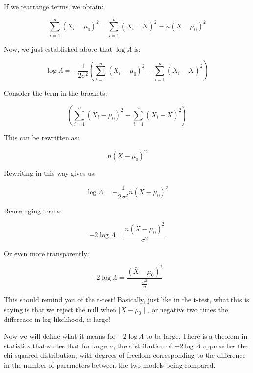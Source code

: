 \documentclass[12pt,]{krantz}
\begin{document}
If we rearrange terms, we obtain:

\begin{equation}
\sum_{i=1}^n (X_i -\mu_0)^2 - \sum_{i=1}^n (X_i - \bar{X})^2 = n(\bar{X} - \mu_0)^2 
\end{equation}

Now, we just established above that \(\log \Lambda\) is:

\begin{equation}
\log \Lambda= -\frac{1}{2\sigma^2} \left( \sum_{i=1}^n (X_i - \mu_0)^2  -  \sum_{i=1}^n (X_i - \bar{X})^2 \right)
\end{equation}

Consider the term in the brackets:

\begin{equation}
(\sum_{i=1}^n (X_i - \mu_0)^2  -  \sum_{i=1}^n (X_i - \bar{X})^2)
\end{equation}

This can be rewritten as:

\begin{equation}
n(\bar{X} - \mu_0)^2
\end{equation}

Rewriting in this way gives us:

\begin{equation}
\log \Lambda = -\frac{1}{2\sigma^2}   n(\bar{X} - \mu_0)^2 
\end{equation}

Rearranging terms:

\begin{equation}
-2 \log \Lambda =    \frac{n(\bar{X} - \mu_0)^2 }{\sigma^2}
\end{equation}

Or even more transparently:

\begin{equation}
-2 \log \Lambda =    \frac{(\bar{X} - \mu_0)^2 }{\frac{\sigma^2}{n}}
\end{equation}

This should remind you of the t-test! Basically, just like in the t-test, what this is saying is that we reject the null when \(\mid \bar{X} - \mu_0\mid\), or negative two times the difference in log likelihood, is large!

Now we will define what it means for \(-2\log \Lambda\) to be large. There is a theorem in statistics that states that for large \(n\), the distribution of \(-2\log \Lambda\) approaches the chi-squared distribution, with degrees of freedom corresponding to the difference in the number of parameters between the two models being compared.
\end{document}
